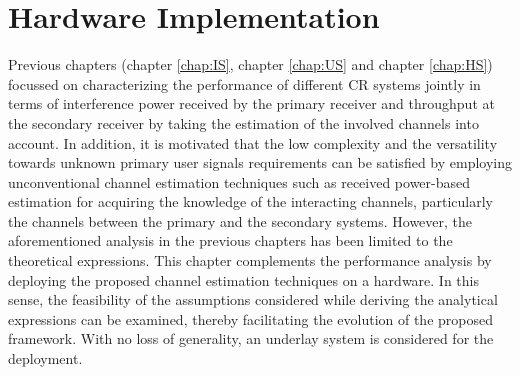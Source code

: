\chapter{Hardware Implementation}
\label{chap:Field}

Previous chapters (chapter \ref{chap:IS}, chapter \ref{chap:US} and chapter \ref{chap:HS}) focussed on characterizing the performance of different CR systems jointly in terms of interference power received by the primary receiver and throughput at the secondary receiver by taking the estimation of the involved channels into account. In addition, it is motivated that the low complexity and the versatility towards unknown primary user signals requirements can be satisfied by employing unconventional channel estimation techniques such as received power-based estimation for acquiring the knowledge of the interacting channels, particularly the channels between the primary and the secondary systems. However, the aforementioned analysis in the previous chapters has been limited to the theoretical expressions. This chapter complements the performance analysis by deploying the proposed channel estimation techniques on a hardware. In this sense, the feasibility of the assumptions considered while deriving the analytical expressions can be examined, thereby facilitating the evolution of the proposed framework. With no loss of generality, an underlay system is considered for the deployment.    

